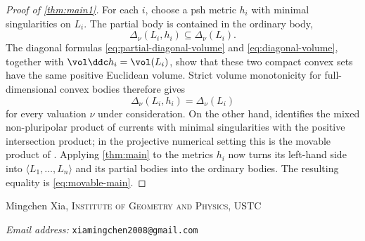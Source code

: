 \documentclass[11pt,a4paper]{amsart}
\begin{document}
\begin{proof}[Proof of \cref{thm:main1}]
For each $i$, choose a psh metric $h_i$ with minimal singularities on
$L_i$.  The partial body is contained in the ordinary body,
\[
 \Delta_\nu(L_i,h_i)\subseteq\Delta_\nu(L_i).
\]
The diagonal formulas \eqref{eq:partial-diagonal-volume} and
\eqref{eq:diagonal-volume}, together with
$\vol\ddc h_i=\vol(L_i)$, show that these two compact convex sets have the
same positive Euclidean volume.  Strict volume monotonicity for
full-dimensional convex bodies therefore gives
\[
 \Delta_\nu(L_i,h_i)=\Delta_\nu(L_i)
\]
for every valuation $\nu$ under consideration.  On the other hand,
\cite[Definition~1.17]{BEGZ10} identifies the mixed non-pluripolar product
of currents with minimal singularities with the positive intersection
product; in the projective numerical setting this is the movable product
of \cite[Propositions~2.12--2.13]{BFJ09}.  Applying \cref{thm:main} to the
metrics $h_i$ now turns its left-hand side into
$\langle L_1,\ldots,L_n\rangle$ and its partial bodies into the ordinary
bodies.  The resulting equality is \eqref{eq:movable-main}.
\end{proof}

\printbibliography
Mingchen Xia, \textsc{Institute of Geometry and Physics, USTC}\par\nopagebreak
  \textit{Email address:} \texttt{xiamingchen2008@gmail.com}
\end{document}
